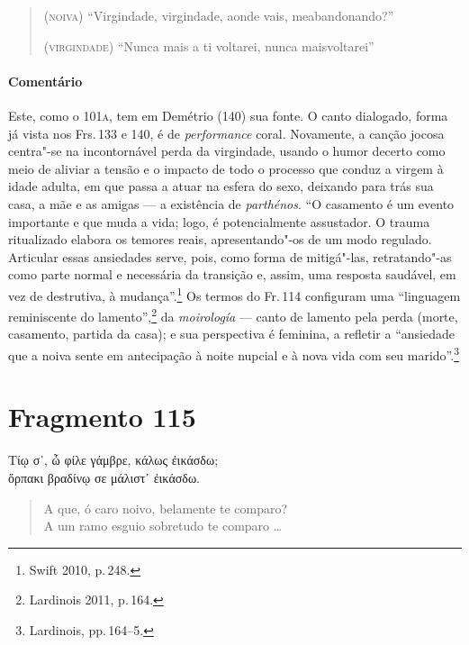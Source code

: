 \begin{verse}
(\textsc{noiva}) ``Virgindade, virgindade, aonde vais, me\qb{}abandonando?''\\

\medskip

(\textsc{virgindade}) ``Nunca mais a ti voltarei, nunca mais\qb{}voltarei''
\end{verse}

\medskip

{\paragraph{Comentário} Este, como o 101\textsc{a}, tem em Demétrio (140) sua fonte. O canto dialogado, forma já vista
nos Frs.\,133 e 140, é de \emph{performance} coral. Novamente, a canção jocosa
centra"-se na incontornável perda da virgindade, usando o humor decerto como
meio de aliviar a tensão e o impacto de todo o processo que conduz a virgem à
idade adulta, em que passa a atuar na esfera do sexo, deixando para trás sua casa, a mãe e as amigas --- a existência de \emph{parthénos}.
``O casamento é um evento importante e que muda a vida; logo, é potencialmente assustador. O trauma ritualizado elabora os temores reais, apresentando"-os de um modo regulado. Articular essas ansiedades serve, pois, como forma de mitigá"-las, retratando"-as como parte normal e necessária da transição e, assim, uma resposta saudável, em vez de destrutiva, à mudança''.\footnote{Swift 2010, p.\,248.}
Os termos do Fr.\,114 configuram uma ``linguagem reminiscente do lamento'',\footnote{Lardinois 2011, p.\,164.} da \emph{moirología} --- canto de lamento pela perda (morte, casamento, partida da casa); e sua perspectiva é feminina, a refletir a ``ansiedade que a noiva sente em antecipação à noite nupcial e à nova vida com seu marido''.\footnote{Lardinois, pp.\,164--5.}}


\section{Fragmento 115}

\begin{gkverse}
Τίῳ σ᾿, ὦ φίλε γάμβρε, κάλως ἐικάσδω;\\
ὄρπακι βραδίνῳ σε μάλιστ᾿ ἐικάσδω.
\end{gkverse}

\begin{verse}
A que, ó caro noivo, belamente te comparo?\\
A um ramo esguio sobretudo te comparo \ldots{}
\end{verse}

